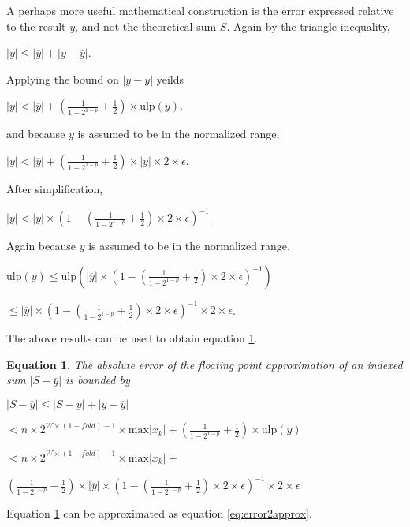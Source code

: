 \documentclass[12pt]{article}
\providecommand{\max}{\ensuremath{\text{max}}}
\providecommand{\ulp}{\ensuremath{\text{ulp}}}
\theoremstyle{plain}
\newtheorem{eq}{Equation}[section]
\begin{document}
    A perhaps more useful mathematical construction is the error expressed relative to the result $\overline{y}$, and not the theoretical sum $S$. Again by the triangle inequality,

    $|y| \leq |\overline{y}| + |y - \overline{y}|$.

    Applying the bound on $|y - \overline{y}|$ yeilds

    $|y| < |\overline{y}| + (\frac{1}{1 - 2^{1 - p}} + \frac{1}{2})\times \ulp(y)$.

    and because $y$ is assumed to be in the normalized range,

    $|y| < |\overline{y}| + (\frac{1}{1 - 2^{1 - p}} + \frac{1}{2})\times|y|\times 2 \times \epsilon$.

    After simplification,

    $|y| < |\overline{y}|\times (1 - (\frac{1}{1 - 2^{1 - p}} + \frac{1}{2})\times 2 \times \epsilon)^{-1}$.

    Again because $y$ is assumed to be in the normalized range,

    $\ulp(y) \leq \ulp(|\overline{y}|\times (1 - (\frac{1}{1 - 2^{1 - p}} + \frac{1}{2})\times 2 \times \epsilon)^{-1})$

    \indent \indent$\leq |\overline{y}|\times (1 - (\frac{1}{1 - 2^{1 - p}} + \frac{1}{2})\times 2 \times \epsilon)^{-1} \times 2 \times \epsilon$.

    The above results can be used to obtain equation \ref{eq:error2}.

    \begin{eq} The absolute error of the floating point approximation of an indexed sum $|S - \overline{y}|$ is bounded by

      $|S - \overline{y}| \leq |S - y| + |y - \overline{y}|$

      \indent\indent$< n \times 2^{W \times (1 - fold) - 1} \times \max|x_k| + (\frac{1}{1 - 2^{1 - p}} + \frac{1}{2})\times \ulp(y)$

      \indent\indent$< n \times 2^{W \times (1 - fold) - 1} \times \max|x_k| + $

      \indent\indent \indent$(\frac{1}{1 - 2^{1 - p}} + \frac{1}{2})\times|\overline{y}|\times (1 - (\frac{1}{1 - 2^{1 - p}} + \frac{1}{2})\times 2 \times \epsilon)^{-1} \times 2 \times \epsilon$
      \label{eq:error2}
    \end{eq}

    Equation \ref{eq:error2} can be approximated as equation \ref{eq:error2approx}.
\end{document}
